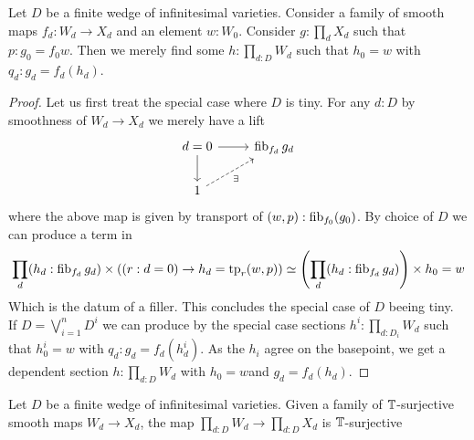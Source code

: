 \begin{lemma}
	Let $D$ be a finite wedge of infinitesimal varieties. Consider a family of smooth maps $f_d : W_d \to X_d$ and an element $w : W_0$.
	Consider $g : \prod_d X_d$ such that $p : g_0 = f_0 w$. Then we merely find some $h : \prod_{d: D} W_d$ such that $h_0 = w$ with $q_d : g_d = f_d (h_d) $.
	
\end{lemma}
\begin{proof}
	Let us first treat the special case where $D$ is tiny.
	For any $d : D$ by smoothness of $W_d \to X_d$ we merely have a lift 
	\[\begin{tikzcd}
		{d=0} & {\fib_{f_d} g_d} \\
		1
		\arrow[from=1-1, to=1-2]
		\arrow[from=1-1, to=2-1]
		\arrow["\exists"', dashed, from=2-1, to=1-2]
	\end{tikzcd}\]
	where the above map is given by transport of $(w , p) : \operatorname{fib}_{f_0}(g_0)$.
	By choice of $D$ we can produce a term in 
	\[
	\prod_d (h_d : \operatorname{fib}_{f_d} g_d) \times ((r : d = 0) \to  h_d = \mathrm{tp}_r(w,p)) \simeq \left(\prod_d (h_d : \operatorname{fib}_{f_d} g_d) \right) \times h_0 = w 
	\]
	Which is the datum of a filler.	This concludes the special case of $D$ beeing tiny. \\
	If $D = \bigvee_{i=1}^n D^i$ we can produce by the special case sections $h^i : \prod_{d: D_i} W_d$ such that $h^i_0 = w$ with $q_d : g_d = f_d(h^i_d)$. As the $h_i$ agree on the basepoint, we get a dependent section $h : \prod_{d: D} W_d$ with $h_0 = w$and $g_d = f_d (h_d)$.
\end{proof}
\begin{lemma}
	Let $D$ be a finite wedge of infinitesimal varieties. Given a family of $\mathbb{T}$-surjective smooth maps $W_d \to X_d$, the map $\prod_{d: D} W_d \to \prod_{d: D} X_d$ is $\mathbb{T}$-surjective
\end{lemma}
